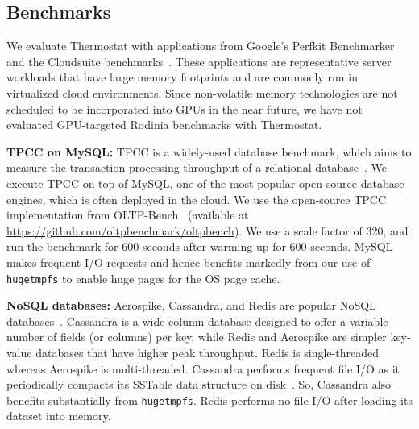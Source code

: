 


\subsection{Benchmarks}
\label{benchmarks}
We evaluate Thermostat with applications from Google's Perfkit Benchmarker and the Cloudsuite
benchmarks~\cite{perfkitbenchmarker, cloudsuite}. These applications are representative server workloads that have
large memory footprints and are commonly run in virtualized cloud environments.
Since non-volatile memory technologies are not scheduled to be incorporated into
GPUs in the near future, we have not evaluated GPU-targeted Rodinia benchmarks
with Thermostat.

{\bf TPCC on MySQL:} TPCC is a widely-used database benchmark, which aims to measure
the transaction processing throughput of a relational database~\cite{tpcc}. We 
execute TPCC on top of MySQL, one of the most popular open-source database 
engines, which is often deployed in the cloud.  We use the open-source
TPCC implementation from OLTP-Bench~\cite{oltpbench} (available at
\url{https://github.com/oltpbenchmark/oltpbench}). We use a scale factor of
320, and run the benchmark for 600 seconds after warming up for 600 seconds.
MySQL makes frequent I/O requests and hence benefits markedly from our use
of {\tt hugetmpfs} to enable huge pages for the OS page cache.

{\bf NoSQL databases:} Aerospike, Cassandra, and Redis are popular NoSQL
databases~\cite{aerospike, cassandra, redis}.
Cassandra is a wide-column database designed to offer a variable number of fields
(or columns) per key, while Redis and Aerospike are simpler key-value databases 
that have higher peak throughput. Redis is single-threaded whereas Aerospike is
multi-threaded.
Cassandra performs frequent file I/O as it periodically compacts its SSTable
data structure on disk~\cite{ref:sstable}. So, Cassandra also benefits substantially
from {\tt hugetmpfs}. Redis performs no file I/O after loading its dataset into memory.

